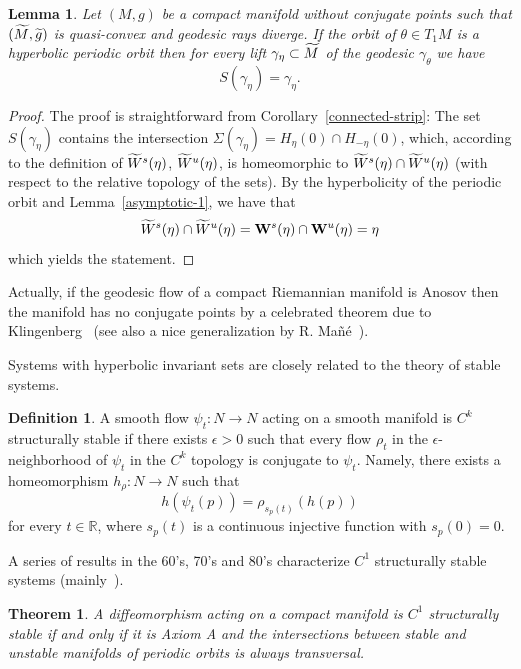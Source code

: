 \documentclass[10pt]{amsart}
\newtheorem{theo}[cdrthm]{Theorem}
\newtheorem{lemm}[cdrthm]{Lemma}
\theoremstyle{definition}
\newtheorem{defi}[cdrthm]{Definition}
\newcommand{\bfW}{\mathbf{W}}
\newcommand{\bbR}{\mathbb{R}}
\let\oldtilde\tilde
\renewcommand*{\tilde}[1]{\mathchoice{\widetilde{#1}}{\widetilde{#1}}{\oldtilde{#1}}{\oldtilde{#1}}}
\begin{document}
\begin{lemm}\label{hyperbolic-no-strip}
Let $(M,g)$ be a compact manifold without conjugate points such that $(\tilde{M}, \tilde{g})$ is quasi-convex and geodesic rays diverge. If the orbit of $\theta \in T_{1}M$ is a hyperbolic periodic orbit then for every lift $\gamma_{\eta} \subset \tilde{M}$ of the geodesic $\gamma_{\theta}$ we have
\[
S(\gamma_{\eta}) = \gamma_{\eta}.
\]
\end{lemm}

\begin{proof}
The proof is straightforward from Corollary~\ref{connected-strip}: The set $S(\gamma_{\eta})$ contains the intersection $\Sigma(\gamma_{\eta}) = H_{\eta}(0) \cap H_{-\eta}(0)$, which, according to the definition of $\tilde{W}^{s}(\eta)$, $\tilde{W}^{u}(\eta)$, is homeomorphic to $\tilde{W}^{s}(\eta) \cap \tilde{W}^{u}(\eta)$ (with respect to the relative topology of the sets). By the hyperbolicity of the periodic orbit and Lemma~\ref{asymptotic-1}, we have that
\[
\tilde{W}^{s}(\eta) \cap \tilde{W}^{u}(\eta) = \bfW^{s}(\eta) \cap \bfW^{u}(\eta) = \eta
\]
which yields the statement.
\end{proof}


Actually, if the geodesic flow of a compact Riemannian manifold is Anosov then the manifold has no conjugate points by a celebrated theorem due to Klingenberg~\cite{kn:Klingenberg} (see also a nice generalization by R. Mañé~\cite{kn:Mane2}).

Systems with hyperbolic invariant sets are closely related to the theory of stable systems.

\begin{defi}\label{Ck-stability}
A smooth flow $\psi_{t} : N\longrightarrow N$ acting on a smooth manifold is $C^{k}$ structurally stable if there exists $\epsilon >0$ such that every flow $\rho_{t}$ in the $\epsilon$-neighborhood of $\psi_{t}$ in the $C^{k}$ topology is conjugate to $\psi_{t}$. Namely, there exists a homeomorphism $h_{\rho}: N\longrightarrow N$ such that
\[
h(\psi_{t}(p)) = \rho_{s_{p}(t)}(h(p))
\]
for every $t \in \bbR$, where $s_{p}(t)$ is a continuous injective function with $s_{p}(0) =0$.
\end{defi}

A series of results in the 60's, 70's and 80's characterize $C^{1}$ structurally stable systems (mainly~\cite{kn:Mane,kn:Mane88,kn:Robin-Robinson,kn:Robin-Robinson2}).

\begin{theo}\label{stab-diffeo}
A diffeomorphism acting on a compact manifold is $C^{1}$ structurally stable if and only if it is Axiom A and the intersections between stable and unstable manifolds of periodic orbits is always transversal.
\end{theo}
\end{document}
